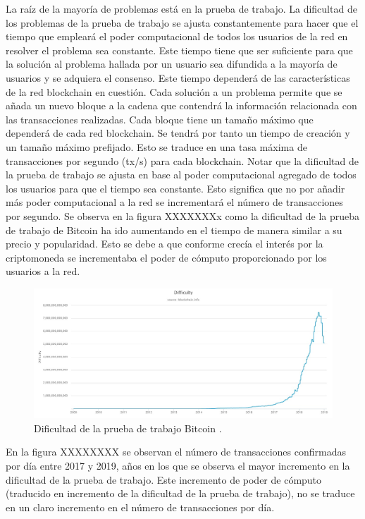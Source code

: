 La raíz de la mayoría de problemas está en la prueba de trabajo. La dificultad de los problemas de la prueba de trabajo se ajusta constantemente para hacer que el tiempo que empleará el poder computacional de todos los usuarios de la red en resolver el problema sea constante. Este tiempo tiene que ser suficiente para que la solución al problema hallada por un usuario sea difundida a la mayoría de usuarios y se adquiera el consenso. Este tiempo dependerá de las características de la red blockchain en cuestión. Cada solución a un problema permite que se añada un nuevo bloque a la cadena que contendrá la información relacionada con las transacciones realizadas. Cada bloque tiene un tamaño máximo que dependerá de cada red blockchain. Se tendrá por tanto un tiempo de creación y un tamaño máximo prefijado. Esto se traduce en una tasa máxima de transacciones por segundo (tx/s) para cada blockchain. Notar que la dificultad de la prueba de trabajo se ajusta en base al poder computacional agregado de todos los usuarios para que el tiempo sea constante. Esto significa que no por añadir más poder computacional a la red se incrementará el número de transacciones por segundo. Se observa en la figura XXXXXXXx como la dificultad de la prueba de trabajo de Bitcoin ha ido aumentando en el tiempo de manera similar a su precio y popularidad. Esto se debe a que conforme crecía el interés por la criptomoneda se incrementaba el poder de cómputo proporcionado por los usuarios a la red.

\begin{figure}
	\centering
	\includegraphics[width=1\textwidth]{imagenes/difficulty.jpeg}
	\caption{\label{fig1}Dificultad de la prueba de trabajo Bitcoin \cite{blockchaininfo}.}
\end{figure}

En la figura XXXXXXXX se observan el número de transacciones confirmadas por día entre 2017 y 2019, años en los que se observa el mayor incremento en la dificultad de la prueba de trabajo. Este incremento de poder de cómputo (traducido en incremento de la dificultad de la prueba de trabajo), no se traduce en un claro incremento en el número de transacciones por día.

